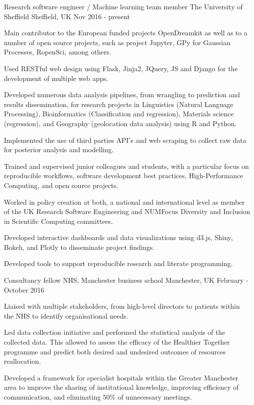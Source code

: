 \begin{cventries}
\cventry
{Research software engineer  / Machine learning team member } %
{The University of Sheffield } %
{Sheffield, UK} %
{Nov 2016 - present } %
{ %
\begin{cvitems}
\item {Main contributor to  the European funded projects OpenDreamkit as well as to a number of open source projects, such as project Jupyter, GPy for Gaussian Processes, RopenSci, among others.}
\item {Used RESTful web design using Flask, Jinja2, JQuery, JS and Django for the development of multiple web apps.}
\item {Developed numerous data analysis pipelines, from wrangling to prediction and results dissemination, for research projects in Linguistics (Natural Language Processing), Bioinformatics (Classification and regression), Materials science (regression), and Geography (geolocation data analysis) using R and Python.}
\item { Implemented the use of third parties API's and web scraping to collect raw data for posterior analysis and modelling.}
\item {Trained and supervised junior colleagues and students, with a particular focus on reproducible workflows, software development best practices, High-Performance Computing, and open source projects.}
\item {Worked in policy creation at both, a national and international level as member of the UK Research Software Engineering and NUMFocus Diversity and Inclusion in Scientific Computing committees.}
\item {Developed interactive dashboards and data visualizations using d3.js, Shiny, Bokeh, and Plotly to disseminate project findings.}
\item{Developed tools to support reproducible research and literate programming.}
\end{cvitems}
}



\cventry
{Consultancy fellow}
{NHS, Manchester business school}
{Manchester, UK}
{February - October 2016}
{
\begin{cvitems}
\item {Liaised with multiple stakeholders, from high-level directors to patients within the NHS to identify organisational needs.}
\item  {Led data collection initiative and performed the statistical analysis of the collected data. This allowed to assess the efficacy of the Healthier Together programme and predict both desired and undesired outcomes of resources reallocation.}
\item{Developed a framework for specialist hospitals within the Greater Manchester area to improve the sharing of institutional knowledge, improving efficiency of communication, and eliminating 50\% of unnecessary meetings.}
\end{cvitems}
}



\end{cventries}
